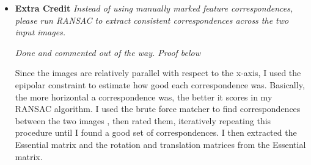 \documentclass[11pt]{article}
\begin{document}
\begin{itemize}
        \item \textbf{Extra Credit} \textit{Instead of using manually marked feature correspondences, please run
        RANSAC to extract consistent correspondences across the two input images.}
        \par
        \textit{\textemdash Done and commented out of the way. Proof below}
        \par
        Since the images are relatively parallel with respect to the x-axis, I used the epipolar constraint to
        estimate how good each correspondence was. Basically, the more horizontal a correspondence was, the better it
        scores in my RANSAC algorithm. I used the brute force matcher to find correspondences between the two images
        , then rated them, iteratively repeating this procedure until I found a good set of correspondences. I then
        extracted the Essential matrix and the rotation and translation matrices from the Essential matrix.\newline
    \end{itemize}
\end{document}
